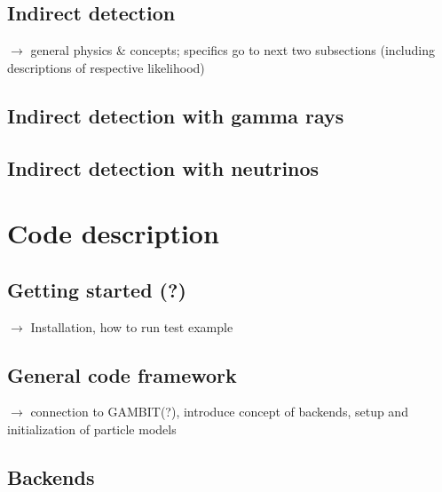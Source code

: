 \subsection{Indirect detection}
\label{phys_id}

$\to$ general physics \& concepts; specifics go to next two subsections 
(including descriptions of respective likelihood)

\subsection{Indirect detection with gamma rays}
\label{phys_ga}

\subsection{Indirect detection with neutrinos}
\label{phys_nu}




\section{Code description}
\label{code}

\subsection{Getting started (?)}
\label{code_init}

$\to$ Installation, how to run test example


\subsection{General code framework}
\label{code_gen}

$\to$ connection to GAMBIT(?), introduce concept of backends, setup and initialization of particle models

\subsection{Backends}
\label{code_gen}

